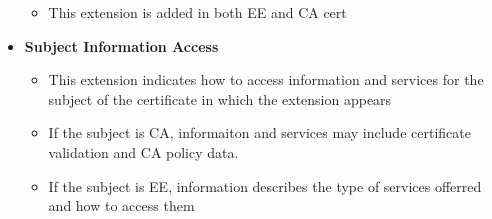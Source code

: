 \documentclass[a4paper]{article}
\begin{document}
\begin{itemize}
\begin{itemize}
                    \item This extension is added in both EE and  CA cert
                \end{itemize}
            \item \textbf{Subject Information Access}
                \begin{itemize}
                    \item This extension indicates how to access information and services for the subject of the certificate in which the extension appears
                    \item If the subject is CA, informaiton and services may include certificate validation and CA policy data. 
                    \item If the subject is EE, information describes the type of services offerred and how to access them
                \end{itemize}
        \end{itemize}
\end{document}
